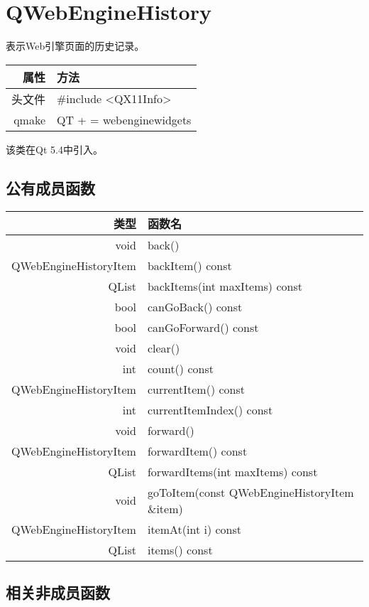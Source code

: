 \chapter{QWebEngineHistory}

表示Web引擎页面的历史记录。

\begin{tabular}{|r|l|}
\hline
属性 & 方法 \\
\hline
头文件 & \#include <QX11Info>\\      
\hline
qmake & QT + = webenginewidgets \\      
\hline
\end{tabular}

该类在Qt 5.4中引入。

\section{公有成员函数}


\begin{tabular}{|r|l|}
	\hline
	类型 & 函数名 \\
	\hline
	void	& back()\\
	\hline
	QWebEngineHistoryItem	& backItem() const \\
	\hline
	QList&	backItems(int maxItems) const \\
	\hline
	bool	&canGoBack() const \\
	\hline
	bool & canGoForward() const \\ 
	\hline
	void &	clear()\\ 
	\hline
	int &	count() const \\
	\hline
	QWebEngineHistoryItem &currentItem()
	 const \\
	\hline
	int &	currentItemIndex() const \\ 
	\hline
	void &	forward() \\ 
	\hline
	QWebEngineHistoryItem &	forwardItem() const \\ 
	\hline
	QList &	forwardItems(int maxItems) const \\
	\hline
	void &	goToItem(const
    QWebEngineHistoryItem \&item)\\
	\hline
	QWebEngineHistoryItem &	itemAt(int i) const \\ 
	\hline
	QList &	items() const \\ 
	\hline
\end{tabular}

\section{相关非成员函数}

